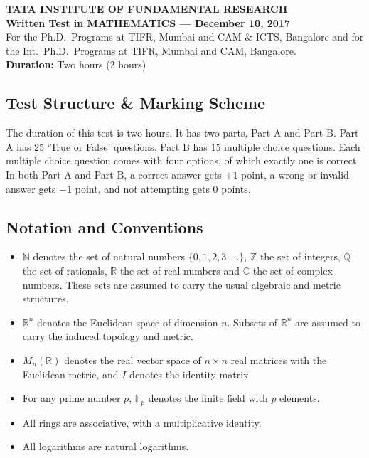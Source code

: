 \documentclass[11pt, a4paper]{article}
\begin{document}
\begin{center}
  \textbf{TATA INSTITUTE OF FUNDAMENTAL RESEARCH}\\
  \textbf{Written Test in MATHEMATICS --- December 10, 2017}\\
  For the Ph.D.\ Programs at TIFR, Mumbai and CAM \& ICTS, Bangalore and for the Int.\ Ph.D.\ Programs at TIFR, Mumbai and CAM, Bangalore.\\
  \textbf{Duration:} Two hours (2 hours)
\end{center}

\subsection*{Test Structure \& Marking Scheme}
The duration of this test is two hours. It has two parts, Part A and Part B. Part A has 25 `True or False' questions. Part B has 15 multiple choice questions. Each multiple choice question comes with four options, of which exactly one is correct. In both Part A and Part B, a correct answer gets $+1$ point, a wrong or invalid answer gets $-1$ point, and not attempting gets $0$ points.

\subsection*{Notation and Conventions}
\begin{itemize}
  \item $\mathbb{N}$ denotes the set of natural numbers $\{0, 1, 2, 3, \dots\}$, $\mathbb{Z}$ the set of integers, $\mathbb{Q}$ the set of rationals, $\mathbb{R}$ the set of real numbers and $\mathbb{C}$ the set of complex numbers. These sets are assumed to carry the usual algebraic and metric structures.
  \item $\mathbb{R}^n$ denotes the Euclidean space of dimension $n$. Subsets of $\mathbb{R}^n$ are assumed to carry the induced topology and metric.
  \item $M_n(\mathbb{R})$ denotes the real vector space of $n \times n$ real matrices with the Euclidean metric, and $I$ denotes the identity matrix.
  \item For any prime number $p$, $\mathbb{F}_p$ denotes the finite field with $p$ elements.
  \item All rings are associative, with a multiplicative identity.
  \item All logarithms are natural logarithms.
\end{itemize}
\end{document}
